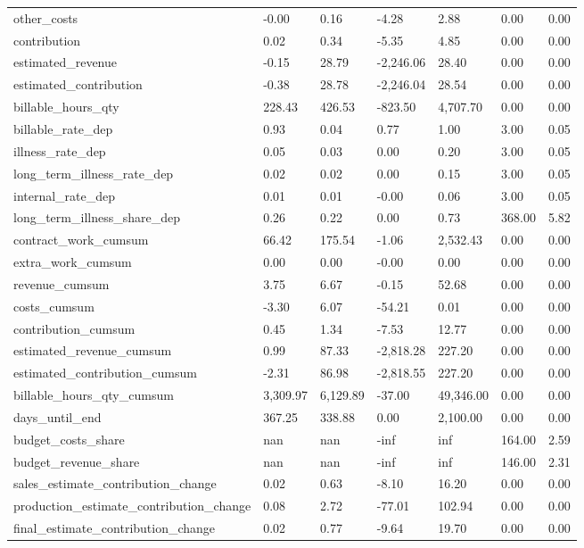 \begin{landscape}
\begin{longtable}[h!]{lllllll}
other_costs & -0.00 & 0.16 & -4.28 & 2.88 & 0.00 & 0.00 \\
contribution & 0.02 & 0.34 & -5.35 & 4.85 & 0.00 & 0.00 \\
estimated_revenue & -0.15 & 28.79 & -2,246.06 & 28.40 & 0.00 & 0.00 \\
estimated_contribution & -0.38 & 28.78 & -2,246.04 & 28.54 & 0.00 & 0.00 \\
billable_hours_qty & 228.43 & 426.53 & -823.50 & 4,707.70 & 0.00 & 0.00 \\
billable_rate_dep & 0.93 & 0.04 & 0.77 & 1.00 & 3.00 & 0.05 \\
illness_rate_dep & 0.05 & 0.03 & 0.00 & 0.20 & 3.00 & 0.05 \\
long_term_illness_rate_dep & 0.02 & 0.02 & 0.00 & 0.15 & 3.00 & 0.05 \\
internal_rate_dep & 0.01 & 0.01 & -0.00 & 0.06 & 3.00 & 0.05 \\
long_term_illness_share_dep & 0.26 & 0.22 & 0.00 & 0.73 & 368.00 & 5.82 \\
contract_work_cumsum & 66.42 & 175.54 & -1.06 & 2,532.43 & 0.00 & 0.00 \\
extra_work_cumsum & 0.00 & 0.00 & -0.00 & 0.00 & 0.00 & 0.00 \\
revenue_cumsum & 3.75 & 6.67 & -0.15 & 52.68 & 0.00 & 0.00 \\
costs_cumsum & -3.30 & 6.07 & -54.21 & 0.01 & 0.00 & 0.00 \\
contribution_cumsum & 0.45 & 1.34 & -7.53 & 12.77 & 0.00 & 0.00 \\
estimated_revenue_cumsum & 0.99 & 87.33 & -2,818.28 & 227.20 & 0.00 & 0.00 \\
estimated_contribution_cumsum & -2.31 & 86.98 & -2,818.55 & 227.20 & 0.00 & 0.00 \\
billable_hours_qty_cumsum & 3,309.97 & 6,129.89 & -37.00 & 49,346.00 & 0.00 & 0.00 \\
days_until_end & 367.25 & 338.88 & 0.00 & 2,100.00 & 0.00 & 0.00 \\
budget_costs_share & nan & nan & -inf & inf & 164.00 & 2.59 \\
budget_revenue_share & nan & nan & -inf & inf & 146.00 & 2.31 \\
sales_estimate_contribution_change & 0.02 & 0.63 & -8.10 & 16.20 & 0.00 & 0.00 \\
production_estimate_contribution_change & 0.08 & 2.72 & -77.01 & 102.94 & 0.00 & 0.00 \\
final_estimate_contribution_change & 0.02 & 0.77 & -9.64 & 19.70 & 0.00 & 0.00 \\

\end{longtable}
\end{landscape}
